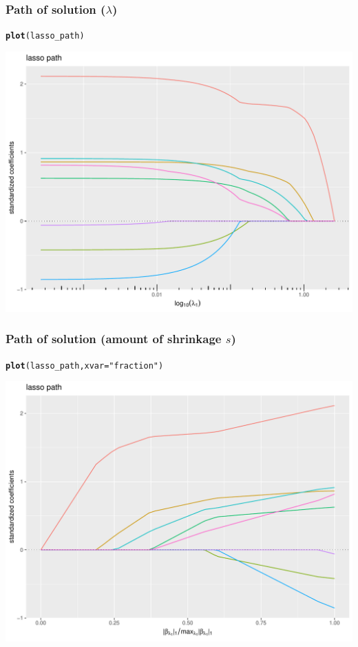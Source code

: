\documentclass[10pt, c, xcolor=x11names]{beamer}\usepackage[]{graphicx}\usepackage[]{color}
\makeatletter
\newcommand{\hlstr}[1]{\textcolor[rgb]{0.192,0.494,0.8}{#1}}%
\newcommand{\hlstd}[1]{\textcolor[rgb]{0.345,0.345,0.345}{#1}}%
\newcommand{\hlkwc}[1]{\textcolor[rgb]{0.333,0.667,0.333}{#1}}%
\newcommand{\hlkwd}[1]{\textcolor[rgb]{0.737,0.353,0.396}{\textbf{#1}}}%
\newenvironment{kframe}{%
 \def\at@end@of@kframe{}%
 \ifinner\ifhmode%
  \def\at@end@of@kframe{\end{minipage}}%
  \begin{minipage}{\columnwidth}%
 \fi\fi%
 \def\FrameCommand##1{\hskip\@totalleftmargin \hskip-\fboxsep
 \colorbox{shadecolor}{##1}\hskip-\fboxsep
     \hskip-\linewidth \hskip-\@totalleftmargin \hskip\columnwidth}%
 \MakeFramed {\advance\hsize-\width
   \@totalleftmargin\z@ \linewidth\hsize
   \@setminipage}}%
 {\par\unskip\endMakeFramed%
 \at@end@of@kframe}
\newenvironment{knitrout}{}{} %
\makeatother
\begin{document}
\begin{frame}[containsverbatim]
  \frametitle{Path of solution ($\lambda$)}

\begin{knitrout}\scriptsize
{}\color{fgcolor}\begin{kframe}
\begin{alltt}
\hlkwd{plot}\hlstd{(lasso_path)}
\end{alltt}
\end{kframe}
\includegraphics[width=.8\textwidth]{figures/ridgeunnamed-chunk-30-1} 

\end{knitrout}
\end{frame}


\begin{frame}[containsverbatim]
  \frametitle{Path of solution (amount of shrinkage $s$)}

\begin{knitrout}\scriptsize
{}\color{fgcolor}\begin{kframe}
\begin{alltt}
\hlkwd{plot}\hlstd{(lasso_path,} \hlkwc{xvar}\hlstd{=}\hlstr{"fraction"}\hlstd{)}
\end{alltt}
\end{kframe}
\includegraphics[width=.8\textwidth]{figures/ridgeunnamed-chunk-31-1} 

\end{knitrout}
\end{frame}
\end{document}
